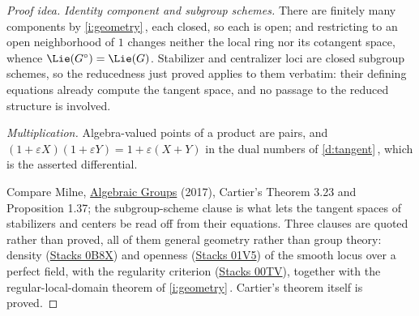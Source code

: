 \documentclass[11pt]{article}
\theoremstyle{plain}
\theoremstyle{definition}
\newcommand{\Cref}[1]{\hyperref[#1]{\ref{#1}}\,\hyperref[#1]{\nameref*{#1}}}
\newcommand{\stacks}[1]{\href{https://stacks.math.columbia.edu/tag/#1}{Stacks #1}}
\begin{document}
\begin{proof}[Proof idea]
\emph{Identity component and subgroup schemes.} There are finitely many
components by \Cref{i:geometry}, each closed, so each is open; and
restricting to an open neighborhood of $1$ changes neither the local ring
nor its cotangent space, whence $\Lie(G^\circ)=\Lie(G)$. Stabilizer and
centralizer loci are closed subgroup schemes, so the reducedness just
proved applies to them verbatim: their defining equations already compute
the tangent space, and no passage to the reduced structure is involved.

\emph{Multiplication.} Algebra-valued points of a product are pairs, and
$(1+\varepsilon X)(1+\varepsilon Y)=1+\varepsilon(X+Y)$ in the dual
numbers of \Cref{d:tangent}, which is the asserted differential.

Compare Milne, \href{https://www.jmilne.org/math/Books/iAG2017.pdf}{Algebraic
Groups} (2017), Cartier's Theorem 3.23 and Proposition 1.37; the
subgroup-scheme clause is what lets the tangent spaces of stabilizers and
centers be read off from their equations. Three clauses are quoted rather
than proved, all of them general geometry rather than group theory: density
(\stacks{0B8X}) and openness (\stacks{01V5}) of the smooth locus over a
perfect field, with the regularity criterion (\stacks{00TV}), together with
the regular-local-domain theorem of \Cref{i:geometry}. Cartier's theorem
itself is proved.
\end{proof}
\end{document}
